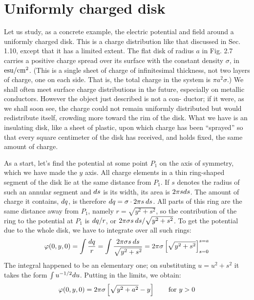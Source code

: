 \section{Uniformly charged disk}

Let us study, as a concrete example, the electric potential and field
around a uniformly charged disk. This is a charge distribution like
that discussed in Sec. 1.10, except that it has a limited extent. The
flat disk of radius $a$ in Fig. 2.7 carries a positive charge spread over its
surface with the constant density $\sigma$, in $\textup{esu}/\textup{cm}^2$. (This is a single sheet
of charge of infinitesimal thickness, not two layers of charge, one on
each side. That is, the total charge in the system is $\pi a^2\sigma$.) We shall
often meet surface charge distributions in the future, especially on
metallic conductors. However the object just described is not a con-
ductor; if it were, as we shall soon see, the charge could not remain
uniformly distributed but would redistribute itself, crowding more
toward the rim of the disk. What we have is an insulating disk, like
a sheet of plastic, upon which charge has been ``sprayed'' so that every
square centimeter of the disk has received, and holds fixed, the same
amount of charge.

As a start, let's find the potential at some point $P_1$ on the axis of
symmetry, which we have made the $y$ axis. All charge elements in a
thin ring-shaped segment of the disk lie at the same distance from $P_1$.
If $s$ denotes the radius of such an annular segment and $d s$ is its width,
its area is $2\pi sd s$. The amount of charge it contains, $d q$, is therefore 
$d q = \sigma\cdot 2\pi s \:d s$. All parts of this ring are the same distance away
from $P_1$, namely $r = \sqrt{y^2+s^2}$, so the contribution of the ring to the
potential at $P_1$ is $d q/r$, or $2\pi\sigma s\:d s/\sqrt{y^2+s^2}$. To get the potential
due to the whole disk, we have to integrate over all such rings:
\begin{equation}
  \varphi(0,y,0) = \int \frac{d q}{r} = \int \frac{2\pi\sigma s\:d s}{\sqrt{y^2+s^2}}
       =2\pi\sigma\left[\sqrt{y^2+s^2}\right]_{s=0}^{s=a}
\end{equation}
The integral happened to be an elementary one; on substituting
$u=u^2+s^2$ it takes the form $\int u^{-1/2}d u$. Putting in the limits, we
obtain:
\begin{equation}
  \varphi(0,y,0) = 2\pi\sigma\left[\sqrt{y^2+a^2}-y\right] \qquad \text{for $y>0$}
\end{equation}


